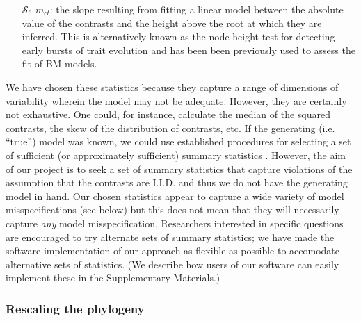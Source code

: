 \documentclass[12pt]{article}
\begin{document}
\begin{enumerate}
\item[$\mathcal{S}_6$] $m_{ct}$: the slope resulting from fitting a linear model between the absolute value of the contrasts and the height above the root at which they are inferred. This is alternatively known as the node height test \citep{FreckletonHarvey2006, SlaterPennell} for detecting early bursts of trait evolution and has been been previously used to assess the fit of BM models. \citep{Garlandetal1992}
\end{enumerate}

We have chosen these statistics because they capture a range of dimensions of variability wherein the model may not be adequate. However, they are certainly not exhaustive. One could, for instance, calculate the median of the squared contrasts, the skew of the distribution of contrasts, etc. If the generating (i.e. ``true'') model was known, we could use established procedures for selecting a set of sufficient (or approximately sufficient) summary statistics \citep[e.g.][]{MajoramJoyce, Wegmann2010}. However, the aim of our project is to seek a set of summary statistics that capture violations of the assumption that the contrasts are I.I.D. and thus we do not have the generating model in hand. Our chosen statistics appear to capture a wide variety of model misspecifications (see below) but this does not mean that they will necessarily capture \textit{any} model misspecification. Researchers interested in specific questions are encouraged to try alternate sets of summary statistics; we have made the software implementation of our approach as flexible as possible to accomodate alternative sets of statistics. (We describe how users of our software can easily implement these in the Supplementary Materials.)

\subsubsection{Rescaling the phylogeny}
\end{document}
